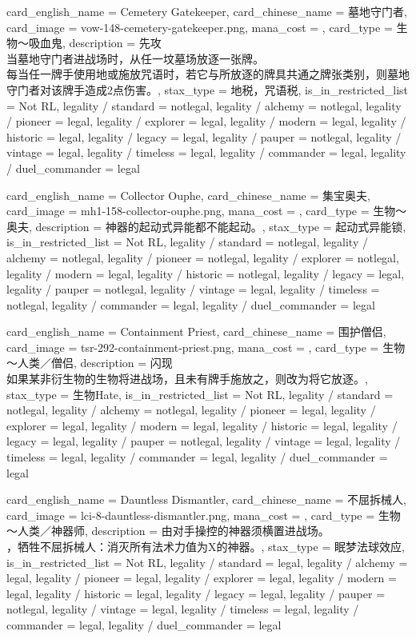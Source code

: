 \documentclass[lang = cn, color = black, 10pt]{AllThatStax}
\begin{document}
\card
{
	card_english_name = {Cemetery Gatekeeper},
	card_chinese_name = {墓地守门者},
	card_image = vow-148-cemetery-gatekeeper.png,
	mana_cost = ,
	card_type = 生物～吸血鬼,
	description = {先攻\\
当墓地守门者进战场时，从任一坟墓场放逐一张牌。\\
每当任一牌手使用地或施放咒语时，若它与所放逐的牌具共通之牌张类别，则墓地守门者对该牌手造成2点伤害。},
	stax_type = 地税，咒语税,
	is_in_restricted_list = Not RL,
	legality / standard = notlegal,
	legality / alchemy = notlegal,
	legality / pioneer = legal,
	legality / explorer = legal,
	legality / modern = legal,
	legality / historic = legal,
	legality / legacy = legal,
	legality / pauper = notlegal,
	legality / vintage = legal,
	legality / timeless = legal,
	legality / commander = legal,
	legality / duel_commander = legal
}

\card
{
	card_english_name = {Collector Ouphe},
	card_chinese_name = {集宝奥夫},
	card_image = mh1-158-collector-ouphe.png,
	mana_cost = ,
	card_type = 生物～奥夫,
	description = {神器的起动式异能都不能起动。},
	stax_type = 起动式异能锁,
	is_in_restricted_list = Not RL,
	legality / standard = notlegal,
	legality / alchemy = notlegal,
	legality / pioneer = notlegal,
	legality / explorer = notlegal,
	legality / modern = legal,
	legality / historic = notlegal,
	legality / legacy = legal,
	legality / pauper = notlegal,
	legality / vintage = legal,
	legality / timeless = notlegal,
	legality / commander = legal,
	legality / duel_commander = legal
}

\card
{
	card_english_name = {Containment Priest},
	card_chinese_name = {围护僧侣},
	card_image = tsr-292-containment-priest.png,
	mana_cost = ,
	card_type = 生物～人类／僧侣,
	description = {闪现\\
如果某非衍生物的生物将进战场，且未有牌手施放之，则改为将它放逐。},
	stax_type = 生物Hate,
	is_in_restricted_list = Not RL,
	legality / standard = notlegal,
	legality / alchemy = notlegal,
	legality / pioneer = legal,
	legality / explorer = legal,
	legality / modern = legal,
	legality / historic = legal,
	legality / legacy = legal,
	legality / pauper = notlegal,
	legality / vintage = legal,
	legality / timeless = legal,
	legality / commander = legal,
	legality / duel_commander = legal
}

\card
{
	card_english_name = {Dauntless Dismantler},
	card_chinese_name = {不屈拆械人},
	card_image = lci-8-dauntless-dismantler.png,
	mana_cost = ,
	card_type = 生物～人类／神器师,
	description = {由对手操控的神器须横置进战场。\\
，牺牲不屈拆械人：消灭所有法术力值为X的神器。},
	stax_type = 眠梦法球效应,
	is_in_restricted_list = Not RL,
	legality / standard = legal,
	legality / alchemy = legal,
	legality / pioneer = legal,
	legality / explorer = legal,
	legality / modern = legal,
	legality / historic = legal,
	legality / legacy = legal,
	legality / pauper = notlegal,
	legality / vintage = legal,
	legality / timeless = legal,
	legality / commander = legal,
	legality / duel_commander = legal
}
\end{document}
